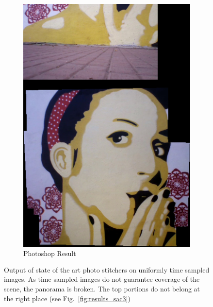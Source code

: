 \begin{figure}[t!]
\begin{subfigure}[b]{0.4\textwidth}
\includegraphics[width=\linewidth]{figures/sac3/uniform_sampled/photoshop.jpg}
\caption{Photoshop Result}
\end{subfigure}
\caption{Output of state of the art photo stitchers on uniformly time
  sampled images. As time sampled images do not guarantee 
  coverage of the scene, the panorama is broken. The top portions do
  not belong at the right place (see Fig.~\ref{fig:results_sac3})}
\label{fig:results_sac3_timesmapled}
\end{figure}


